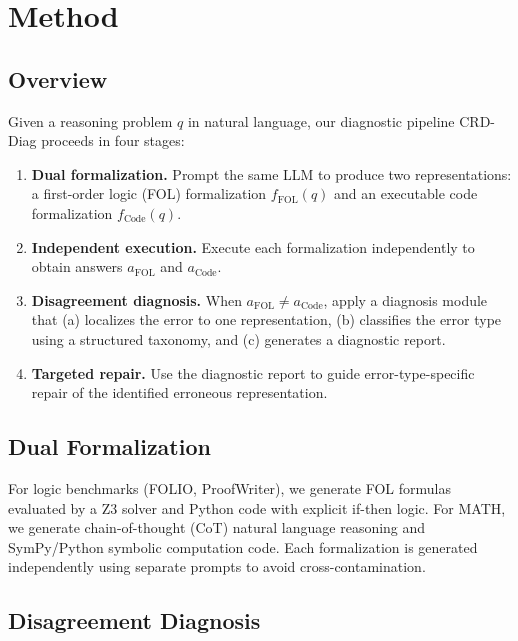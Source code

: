 \documentclass[11pt,a4paper]{article}
\newcommand{\ours}{CRD-Diag}
\begin{document}
\section{Method}
\label{sec:method}

\subsection{Overview}

Given a reasoning problem $q$ in natural language, our diagnostic pipeline \ours{} proceeds in four stages:

\begin{enumerate}[leftmargin=*,itemsep=2pt]
\item \textbf{Dual formalization.} Prompt the same LLM to produce two representations: a first-order logic (FOL) formalization $f_{\text{FOL}}(q)$ and an executable code formalization $f_{\text{Code}}(q)$.
\item \textbf{Independent execution.} Execute each formalization independently to obtain answers $a_{\text{FOL}}$ and $a_{\text{Code}}$.
\item \textbf{Disagreement diagnosis.} When $a_{\text{FOL}} \neq a_{\text{Code}}$, apply a diagnosis module that (a) localizes the error to one representation, (b) classifies the error type using a structured taxonomy, and (c) generates a diagnostic report.
\item \textbf{Targeted repair.} Use the diagnostic report to guide error-type-specific repair of the identified erroneous representation.
\end{enumerate}

\subsection{Dual Formalization}
\label{sec:dual}

For logic benchmarks (FOLIO, ProofWriter), we generate FOL formulas evaluated by a Z3 solver and Python code with explicit if-then logic. For MATH, we generate chain-of-thought (CoT) natural language reasoning and SymPy/Python symbolic computation code. Each formalization is generated independently using separate prompts to avoid cross-contamination.

\subsection{Disagreement Diagnosis}
\label{sec:diagnosis}
\end{document}

